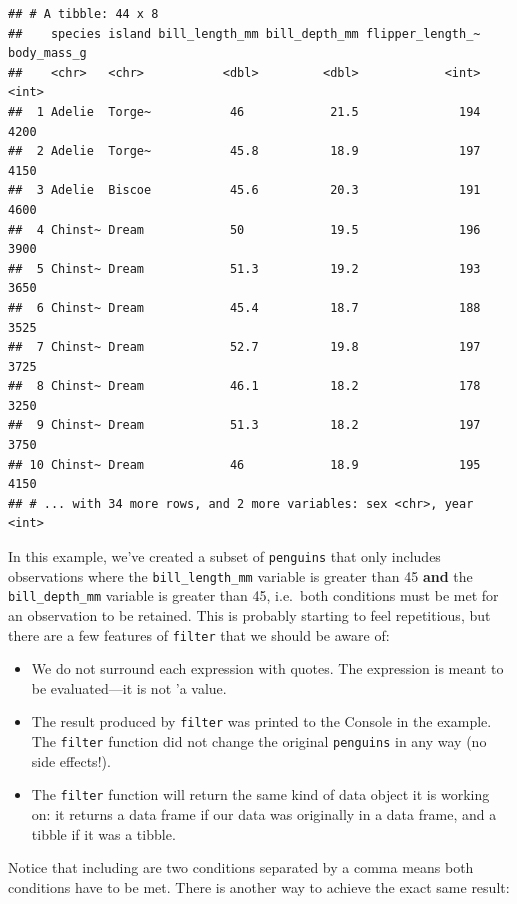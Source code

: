 \documentclass[
]{book}
\providecommand{\tightlist}{%
  \setlength{\itemsep}{0pt}\setlength{\parskip}{0pt}}
\begin{document}
\begin{verbatim}
## # A tibble: 44 x 8
##    species island bill_length_mm bill_depth_mm flipper_length_~ body_mass_g
##    <chr>   <chr>           <dbl>         <dbl>            <int>       <int>
##  1 Adelie  Torge~           46            21.5              194        4200
##  2 Adelie  Torge~           45.8          18.9              197        4150
##  3 Adelie  Biscoe           45.6          20.3              191        4600
##  4 Chinst~ Dream            50            19.5              196        3900
##  5 Chinst~ Dream            51.3          19.2              193        3650
##  6 Chinst~ Dream            45.4          18.7              188        3525
##  7 Chinst~ Dream            52.7          19.8              197        3725
##  8 Chinst~ Dream            46.1          18.2              178        3250
##  9 Chinst~ Dream            51.3          18.2              197        3750
## 10 Chinst~ Dream            46            18.9              195        4150
## # ... with 34 more rows, and 2 more variables: sex <chr>, year <int>
\end{verbatim}

In this example, we've created a subset of \texttt{penguins} that only includes observations where the \texttt{bill\_length\_mm} variable is greater than 45 \textbf{and} the \texttt{bill\_depth\_mm} variable is greater than 45, i.e.~both conditions must be met for an observation to be retained. This is probably starting to feel repetitious, but there are a few features of \texttt{filter} that we should be aware of:

\begin{itemize}
\tightlist
\item
  We do not surround each expression with quotes. The expression is meant to be evaluated---it is not 'a value.
\item
  The result produced by \texttt{filter} was printed to the Console in the example. The \texttt{filter} function did not change the original \texttt{penguins} in any way (no side effects!).
\item
  The \texttt{filter} function will return the same kind of data object it is working on: it returns a data frame if our data was originally in a data frame, and a tibble if it was a tibble.
\end{itemize}

Notice that including are two conditions separated by a comma means both conditions have to be met. There is another way to achieve the exact same result:
\end{document}
